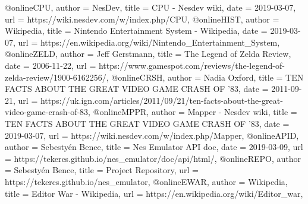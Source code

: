 @online{CPU,
	author = {NesDev},
	title = {CPU - Nesdev wiki},
	date = {2019-03-07},
	url = {https://wiki.nesdev.com/w/index.php/CPU},
}
@online{HIST,
	author = {Wikipedia},
	title = {Nintendo Entertainment System - Wikipedia},
	date = {2019-03-07},
	url = {https://en.wikipedia.org/wiki/Nintendo_Entertainment_System},
}
@online{ZELD,
	author = {Jeff Gerstmann},
	title = {The Legend of Zelda Review},
	date = {2006-11-22},
	url = {https://www.gamespot.com/reviews/the-legend-of-zelda-review/1900-6162256/},
}
@online{CRSH,
	author = {Nadia Oxford},
	title = {TEN FACTS ABOUT THE GREAT VIDEO GAME CRASH OF '83},
	date = {2011-09-21},
	url = {https://uk.ign.com/articles/2011/09/21/ten-facts-about-the-great-video-game-crash-of-83},
}
@online{MPPR,
	author = {Mapper - Nesdev wiki},
	title = {TEN FACTS ABOUT THE GREAT VIDEO GAME CRASH OF '83},
	date = {2019-03-07},
	url = {https://wiki.nesdev.com/w/index.php/Mapper},
}
@online{APID,
	author = {Sebestyén Bence},
	title = {Nes Emulator API doc},
	date = {2019-03-09},
	url = {https://tekercs.github.io/nes_emulator/doc/api/html/},
}
@online{REPO,
	author = {Sebestyén Bence},
	title = {Project Repository},
	url = {https://tekercs.github.io/nes_emulator},
}
@online{EWAR,
	author = {Wikipedia},
	title = {Editor War - Wikipedia},
	url = {https://en.wikipedia.org/wiki/Editor_war},
}

